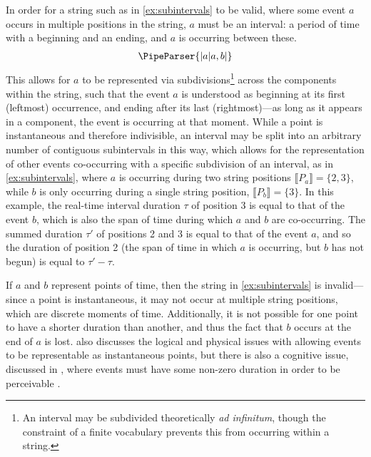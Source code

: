 \documentclass[a4paper,12pt,leqno,twoside]{article}
\newcommand{\vph}[1]{\vphantom{#1}}
\newcommand{\ebox}[1]{\fbox{$\vph{'(),}#1$}}
\newcommand{\EventString}[1]{%
	\renewcommand*{\do}[1]{\ebox{##1}}%
	\PipeParser{#1}%
}
\begin{document}
In order for a string such as in \cref{ex:subintervals} to be valid, where some event $a$ occurs in multiple positions in the string, $a$ must be an interval: a period of time with a beginning and an ending, and $a$ is occurring between these.
\begin{align}\label{ex:subintervals}
	\EventString{{}|a|a,b|{}}
\end{align}
This allows for $a$ to be represented via subdivisions\footnote{An interval may be subdivided theoretically \textit{ad infinitum}, though the constraint of a finite vocabulary prevents this from occurring within a string.} across the components within the string, such that the event $a$ is understood as beginning at its first (leftmost) occurrence, and ending after its last (rightmost)---as long as it appears in a component, the event is occurring at that moment. While a point is instantaneous and therefore indivisible, an interval may be split into an arbitrary number of contiguous subintervals in this way, which allows for the representation of other events co-occurring with a specific subdivision of an interval, as in \cref{ex:subintervals}, where $a$ is occurring during two string positions $\llbracket P_a \rrbracket = \{2, 3\}$, while $b$ is only occurring during a single string position, $\llbracket P_b \rrbracket = \{3\}$. In this example, the real-time interval duration $\tau$ of position 3 is equal to that of the event $b$, which is also the span of time during which $a$ and $b$ are co-occurring. The summed duration $\tau'$ of positions 2 and 3 is equal to that of the event $a$, and so the duration of position 2 (the span of time in which $a$ is occurring, but $b$ has not begun) is equal to $\tau' - \tau$.

If $a$ and $b$ represent points of time, then the string in \cref{ex:subintervals} is invalid---since a point is instantaneous, it may not occur at multiple string positions, which are discrete moments of time. Additionally, it is not possible for one point to have a shorter duration than another, and thus the fact that $b$ occurs at the end of $a$ is lost. \citet{allen1983maintaining} also discusses the logical and physical issues with allowing events to be representable as instantaneous points, but there is also a cognitive issue, discussed in \citet{Freksa1992}, where events must have some non-zero duration in order to be perceivable \citep{hamblin1972instants}.
\end{document}
